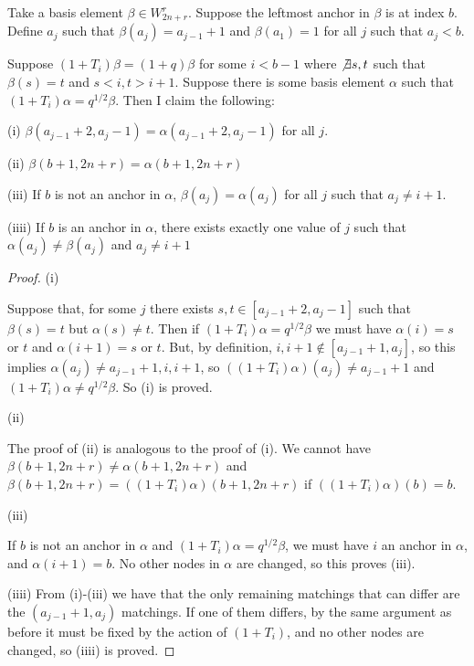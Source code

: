 \documentclass{amsart}
\begin{document}
\vspace{5mm}
\begin{lemma}
	Take a basis element $\beta\in W_{2n+r}^r$. Suppose the leftmost anchor in $\beta$ is at index $b$. Define $a_j$ such that $\beta(a_j)=a_{j-1}+1$ and $\beta(a_1)=1$ for all $j$ such that $a_j<b$. 
	
	Suppose $(1+T_i)\beta=(1+q)\beta$ for some $i<b-1$ where $\not\exists s,t$ such that $\beta(s)=t$ and $s<i,t>i+1$. Suppose there is some basis element $\alpha$ such that $(1+T_i)\alpha=q^{1/2}\beta$. Then I claim the following:
	
	\vspace{5mm}
	\begin{center}
		(i) $\beta(a_{j-1}+2,a_j-1)=\alpha(a_{j-1}+2,a_j-1)$ for all $j$.
		
		\vspace{5mm}
		(ii) $\beta(b+1,2n+r)=\alpha(b+1,2n+r)$
		
		\vspace{5mm}
		(iii)
		If $b$ is not an anchor in $\alpha$, $\beta(a_j)=\alpha(a_j)$ for all $j$ such that $a_j\not=i+1$.
		
		\vspace{5mm}
		(iiii) If $b$ is an anchor in $\alpha$, there exists exactly one value of $j$ such that $\alpha(a_j)\not=\beta(a_j)$ and $a_j\not=i+1$
	\end{center}
\end{lemma}

\begin{proof}
	
	(i)
	
	Suppose that, for some $j$ there exists $s,t\in [a_{j-1}+2,a_j-1]$ such that $\beta(s)=t$ but $\alpha(s)\not=t$. Then if $(1+T_i)\alpha=q^{1/2}\beta$ we must have $\alpha(i)=s$ or $t$ and $\alpha(i+1)=s$ or $t$. But, by definition, $i,i+1\not\in[a_{j-1}+1,a_j]$, so this implies $\alpha(a_j)\not=a_{j-1}+1,i,i+1$, so $((1+T_i)\alpha)(a_j)\not=a_{j-1}+1$ and $(1+T_i)\alpha\not=q^{1/2}\beta$. So (i) is proved.
	
	\vspace{5mm}
	(ii)
	
	The proof of (ii) is analogous to the proof of (i). We cannot have $\beta(b+1,2n+r)\not=\alpha(b+1,2n+r)$ and $\beta(b+1,2n+r)=((1+T_i)\alpha)(b+1,2n+r)$ if $((1+T_i)\alpha)(b)=b$.
	
	\vspace{5mm}
	(iii)
	
	If $b$ is not an anchor in $\alpha$ and $(1+T_i)\alpha=q^{1/2}\beta$, we must have $i$ an anchor in $\alpha$, and $\alpha(i+1)=b$. No other nodes in $\alpha$ are changed, so this proves (iii).
	
	\vspace{5mm}
	(iiii)
	From (i)-(iii) we have that the only remaining matchings that can differ are the $(a_{j-1}+1,a_j)$ matchings. If one of them differs, by the same argument as before it must be fixed by the action of $(1+T_i)$, and no other nodes are changed, so (iiii) is proved.
	
\end{proof}
\end{document}
